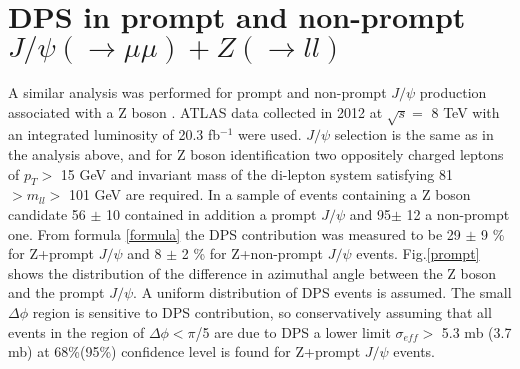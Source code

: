 \documentclass{ws-rv9x6}
\begin{document}
 \section{DPS in prompt and non-prompt $J/\psi(\rightarrow \mu\mu) + Z(\rightarrow ll)$ }
\label{Z}
A similar analysis was performed for prompt and non-prompt $J/\psi$ production associated with a Z boson \cite{dps3}. ATLAS data collected in 2012 at $\sqrt{s} = $ 8 TeV with an integrated luminosity of 20.3 fb$^{-1}$ were used.
$J/\psi$ selection is the same as in the analysis above, and for Z boson identification two oppositely charged leptons of $p_T > $ 15 GeV and invariant mass of the di-lepton system satisfying 81 $ > m_{ll} > $ 101 GeV are required.
In a sample of events containing a Z boson candidate 56 $\pm$ 10 contained in addition a prompt $J/\psi$ and 
95$\pm$ 12 a non-prompt one.
From  formula \ref{formula} 
the DPS contribution   
was measured to be 29 $\pm$ 9 \% for Z+prompt $J/\psi$ and 8 $\pm$ 2 \% for Z+non-prompt $J/\psi$ events. 
Fig.\ref{prompt} shows the distribution of the difference in azimuthal angle between the Z boson and the prompt  $J/\psi$. A uniform distribution of DPS events is assumed.  The small $\Delta \phi$ region is sensitive to DPS contribution, so 
conservatively assuming that all events in the region of $\Delta\phi < \pi$/5 are due to DPS a lower limit $\sigma_{e\!f\!f} >$ 5.3 mb (3.7 mb) at 68\%(95\%) confidence level is found for Z+prompt $J/\psi$ events.

 
\end{document}
